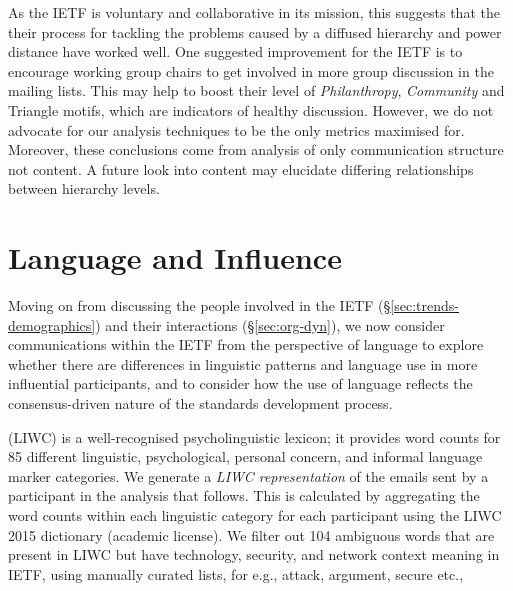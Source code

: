 \documentclass[twocolumn,10pt]{article}
\newcommand{\pb}[1]{\vspace{0.75ex}\noindent{\textbf{#1}}}
\begin{document}
As the IETF is voluntary and collaborative in its mission, this suggests
that the their process for tackling the problems caused by a diffused
hierarchy and power distance have worked well. One suggested improvement
for the IETF is to encourage working group chairs to get involved in more
group discussion in the mailing lists. This may help to boost their level
of \textit{Philanthropy}, \textit{Community} and Triangle motifs, which are
indicators of healthy discussion. However, we do not advocate for our
analysis techniques to be the only metrics maximised for.  Moreover, these
conclusions come from analysis of only communication structure not content.
A future look into content may elucidate differing relationships between
hierarchy levels.


\section{Language and Influence}
\label{sec:language}

Moving on from discussing the people involved in the IETF (\S\ref{sec:trends-demographics})
and their interactions (\S\ref{sec:org-dyn}), we now consider communications
within the IETF from the perspective of language to explore whether there
are differences in linguistic patterns and language use in more influential
participants, and to consider how the use of language reflects the
consensus-driven nature of the standards development process.


\pb{Linguistic Inquiry and Word Count} (LIWC) \cite{pennebaker2015development}
is a well-recognised psycholinguistic lexicon; it provides word counts for
85 different linguistic, psychological, personal concern, and informal
language marker categories. We generate a \emph{LIWC representation} of
the emails sent by a participant in the analysis that follows. This is
calculated by aggregating the word counts within each linguistic category
for each participant using the LIWC 2015 dictionary (academic license).
We filter out 104 ambiguous words that are present in LIWC but have
technology, security, and network context meaning in IETF, using manually
curated lists, for e.g., attack, argument, secure etc., 
\end{document}
